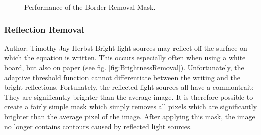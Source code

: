 \documentclass[12pt]{article}
\begin{document}
	\begin{figure}[htp]
		\centering
		\quad
		
		\quad
		
		\caption{Performance of the Border Removal Mask.}
		\label{fig:BorderRemoval}
	\end{figure}
	
	\subsubsection{Reflection Removal}
	\small{Author: Timothy Jay Herbst} \newline \newline
	Bright light sources may reflect off the surface on which the equation is written.
	This occurs especially often when using a white board, but also on paper (see fig. \ref{fig:BrightnessRemoval}).
	Unfortunately, the adaptive threshold function cannot differentiate between the writing and the bright reflections.
	Fortunately, the reflected light sources all have a commontrait:
	They are significantly brighter than the average image.
	It is therefore possible to create a fairly simple mask which simply removes all pixels which are significantly brighter than the average pixel of the image.
	After applying this mask, the image no longer contains contours caused by reflected light sources.%
	
\end{document}
